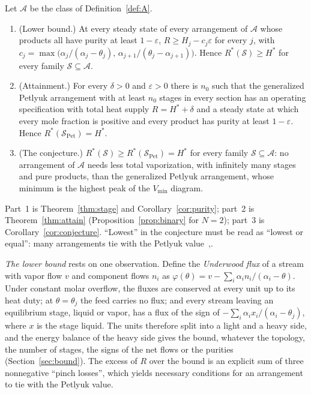 \documentclass[11pt,a4paper]{report}
\newcommand{\cA}{\mathcal A}
\newcommand{\cS}{\mathcal S}
\newcommand{\Hs}{H^{*}}
\newcommand{\Spet}{\cS_{\mathrm{Pet}}}
\begin{document}
\begin{theorem}\label{thm:main}
Let \(\cA\) be the class of Definition~\ref{def:A}.
\begin{enumerate}
\item (Lower bound.) At every steady state of every arrangement of \(\cA\) whose products all have purity at least
\(1-\varepsilon\), \(R\ge H_j-c_j\varepsilon\) for every \(j\), with
\(c_j=\max\bigl(\alpha_j/(\alpha_j-\theta_j),\,\alpha_{j+1}/(\theta_j-\alpha_{j+1})\bigr)\). Hence \(R^*(\cS)\ge\Hs\) for
every family \(\cS\subseteq\cA\).
\item (Attainment.) For every \(\delta>0\) and \(\varepsilon>0\) there is \(n_0\) such that the generalized Petlyuk
arrangement with at least \(n_0\) stages in every section has an operating specification with total heat supply
\(R=\Hs+\delta\) and a steady state at which every mole fraction is positive and every product has purity at least
\(1-\varepsilon\). Hence \(R^*(\Spet)=\Hs\).
\item (The conjecture.) \(R^*(\cS)\ge R^*(\Spet)=\Hs\) for every family \(\cS\subseteq\cA\): no arrangement of \(\cA\)
needs less total vaporization, with infinitely many stages and pure products, than the generalized Petlyuk
arrangement, whose minimum is the highest peak of the \(V_{\min}\) diagram.
\end{enumerate}
\end{theorem}

Part~1 is Theorem~\ref{thm:stage} and Corollary~\ref{cor:purity}; part~2 is Theorem~\ref{thm:attain}
(Proposition~\ref{prop:binary} for \(N=2\)); part~3 is Corollary~\ref{cor:conjecture}. ``Lowest'' in the conjecture
must be read as ``lowest or equal'': many arrangements tie with the Petlyuk value~\autocite[\S7]{HS3},\autocite{Jiang2018}.

\emph{The lower bound} rests on one observation. Define the \emph{Underwood flux} of a stream with vapor flow \(v\) and
component flows \(n_i\) as \(\varphi(\theta)=v-\sum_i\alpha_in_i/(\alpha_i-\theta)\). Under constant molar overflow, the
fluxes are conserved at every unit up to its heat duty; at \(\theta=\theta_j\) the feed carries no flux; and every stream
leaving an equilibrium stage, liquid or vapor, has a flux of the sign of \(-\sum_i\alpha_ix_i/(\alpha_i-\theta_j)\), where
\(x\) is the stage liquid. The units therefore split into a light and a heavy side, and the energy balance of the heavy
side gives the bound, whatever the topology, the number of stages, the signs of the net flows or the purities
(Section~\ref{sec:bound}). The excess of \(R\) over the bound is an explicit sum of three nonnegative ``pinch losses'',
which yields necessary conditions for an arrangement to tie with the Petlyuk value.
\end{document}
